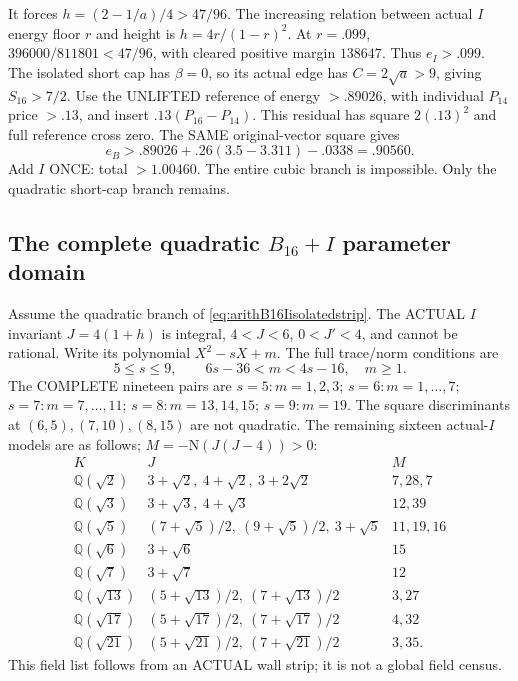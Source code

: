 \documentclass[11pt]{article}
\begin{document}
It forces \(h=(2-1/a)/4>47/96\).
The increasing relation between actual
\(I\) energy floor \(r\) and height is
\(h=4r/(1-r)^2\).
At \(r=.099\),
\(396000/811801<47/96\), with cleared
positive margin \(138647\).
Thus \(e_I>.099\).
The isolated short cap has \(\beta=0\),
so its actual edge has
\(C=2\sqrt a>9\), giving \(S_{16}>7/2\).
Use the UNLIFTED reference of energy
\(>.89026\), with individual
\(P_{14}\) price \(>.13\), and insert
\(.13(P_{16}-P_{14})\).
This residual has square \(2(.13)^2\)
and full reference cross zero.
The SAME original-vector square gives
\[
                    e_B>.89026+.26(3.5-3.311)-.0338=.90560 .
\]
Add \(I\) ONCE: total \(>1.00460\).
The entire cubic branch is impossible.
Only the quadratic short-cap branch remains.

\subsection{The complete quadratic \(B_{16}+I\) parameter domain}
\label{app:arithB16Iquadratic}

Assume the quadratic branch of
\eqref{eq:arithB16Iisolatedstrip}.
The ACTUAL \(I\) invariant \(J=4(1+h)\)
is integral, \(4<J<6\), \(0<J'<4\),
and cannot be rational.
Write its polynomial \(X^2-sX+m\).
The full trace/norm conditions are
\[
              5\le s\le9,\qquad 6s-36<m<4s-16,\quad m\ge1 .
\]
The COMPLETE nineteen pairs are
\(s=5:m=1,2,3\);
\(s=6:m=1,\ldots,7\);
\(s=7:m=7,\ldots,11\);
\(s=8:m=13,14,15\);
\(s=9:m=19\).
The square discriminants at
\((6,5),(7,10),(8,15)\) are not quadratic.
The remaining sixteen actual-\(I\) models
are as follows; \(M=-\mathrm N(J(J-4))>0\):
\[
\begin{array}{c|l|l}
 K&J&M\\ \hline
 \mathbb Q(\sqrt2)&3+\sqrt2,\ 4+\sqrt2,\ 3+2\sqrt2&7,28,7\\
 \mathbb Q(\sqrt3)&3+\sqrt3,\ 4+\sqrt3&12,39\\
 \mathbb Q(\sqrt5)&(7+\sqrt5)/2,\ (9+\sqrt5)/2,\ 3+\sqrt5&11,19,16\\
 \mathbb Q(\sqrt6)&3+\sqrt6&15\\
 \mathbb Q(\sqrt7)&3+\sqrt7&12\\
 \mathbb Q(\sqrt{13})&(5+\sqrt{13})/2,\ (7+\sqrt{13})/2&3,27\\
 \mathbb Q(\sqrt{17})&(5+\sqrt{17})/2,\ (7+\sqrt{17})/2&4,32\\
 \mathbb Q(\sqrt{21})&(5+\sqrt{21})/2,\ (7+\sqrt{21})/2&3,35 .
\end{array}
\]
This field list follows from an ACTUAL
wall strip; it is not a global field census.
\end{document}
